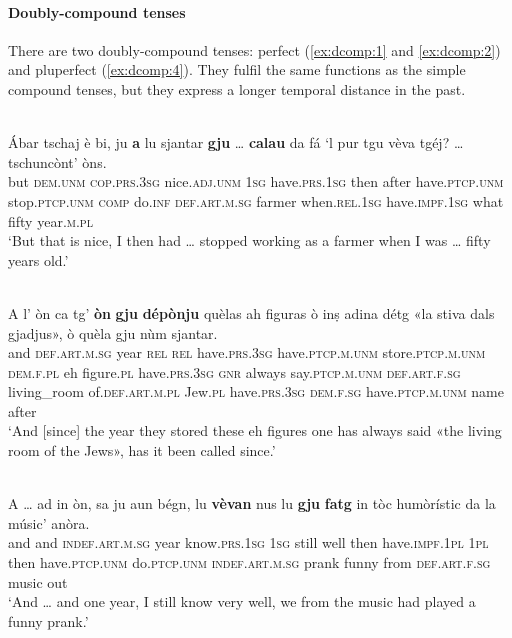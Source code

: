 \paragraph{Doubly-compound tenses}
There are two doubly-compound tenses: perfect (\ref{ex:dcomp:1} and \ref{ex:dcomp:2}) and pluperfect (\ref{ex:dcomp:4}). They fulfil the same functions as the simple compound tenses, but they express a longer temporal distance in the past.

\ea
\label{ex:dcomp:1}
\\
\gll    Ábar tschaj è bi, ju \textbf{a} lu sjantar \textbf{gju} … \textbf{calau} da fá `l pur tgu vèva tgéj? … tschuncònt’ òns.\\
but \textsc{dem.unm} \textsc{cop.prs.3sg} nice.\textsc{adj.unm} \textsc{1sg} have.\textsc{prs.1sg} then after have.\textsc{ptcp.unm} {} stop.\textsc{ptcp.unm} \textsc{comp} do.\textsc{inf} \textsc{def.art.m.sg} farmer when.\textsc{rel.1sg} have.\textsc{impf.1sg} what {} fifty year.\textsc{m.pl}\\
\glt `But that is nice, I then had … stopped working as a farmer when I was … fifty years old.'
\z

\ea
\label{ex:dcomp:2}
\\
\gll A l’ òn ca tg’ \textbf{òn} \textbf{gju} \textbf{dépònju} quèlas ah figuras ò inṣ adina détg «la stiva dals gjadjus», ò quèla gju nùm sjantar.\\
and \textsc{def.art.m.sg} year \textsc{rel} \textsc{rel} have.\textsc{prs.3sg} have.\textsc{ptcp.m.unm} store.\textsc{ptcp.m.unm} \textsc{dem.f.pl} eh figure.\textsc{pl} have.\textsc{prs.3sg} \textsc{gnr} always say.\textsc{ptcp.m.unm} \textsc{def.art.f.sg} living\_room of.\textsc{def.art.m.pl} Jew.\textsc{pl} have.\textsc{prs.3sg} \textsc{dem.f.sg} have.\textsc{ptcp.m.unm} name after\\
\glt `And [since] the year they stored these eh figures one has always said «the living room of the Jews», has it been called since.'
\z

\ea
\label{ex:dcomp:4}
\\
\gll    A … ad in òn, sa ju aun bégn, lu \textbf{vèvan} nus lu \textbf{gju} \textbf{fatg} in tòc humòrístic  da la músic’ anòra.\\
and {} and  \textsc{indef.art.m.sg} year know.\textsc{prs.1sg} \textsc{1sg} still well then have.\textsc{impf.1pl} \textsc{1pl} then have.\textsc{ptcp.unm} do.\textsc{ptcp.unm} \textsc{indef.art.m.sg} prank funny from \textsc{def.art.f.sg} music out\\
\glt `And … and one year, I still know very well, we from the music had played a funny prank.'
\z




